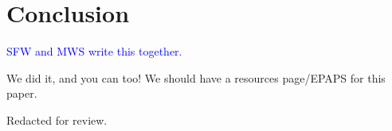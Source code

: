 \documentclass[aip, numerical, preprint]{revtex4-2}
\begin{document}
\section{Conclusion}
\textcolor{blue}{SFW and MWS write this together.}

We did it, and you can too!  We should have a resources page/EPAPS for this paper.

\begin{acknowledgments}
  Redacted for review.%
\end{acknowledgments}


\end{document}
